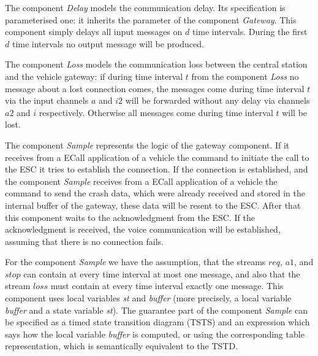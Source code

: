 \noindent
The component \emph{Delay} models the communication delay. 
Its specification is parameterised one: 
it inherits the parameter of the component \emph{Gateway}. 
This component simply delays all input messages on $d$ time intervals. 
During the first $d$ time intervals no output message will be produced. 

The component \emph{Loss} models the communication loss between 
the central station and the vehicle gateway: 
if during time interval $t$ from the component \emph{Loss} no message about a 
lost connection comes, the messages come during time interval 
$t$ via the input channels $a$ and $i2$ will be forwarded without any delay via channels 
$a2$ and $i$ respectively. 
Otherwise all messages come during time interval 
$t$ will be lost.  
  
The component \emph{Sample} represents the logic of the gateway component. 
If it receives from a ECall application of a vehicle 
 the command to initiate the call to the ESC it tries 
 to establish the connection.
If the connection is established, and the component \emph{Sample} receives 
from a ECall application of a vehicle
 the command to send the crash data, which were already received and stored 
 in the internal buffer of the gateway, 
 these data will be resent to the ESC. 
 After that this component waits to the acknowledgment from the ESC. 
 If the acknowledgment is received, the voice communication will be established, assuming that
  there is no connection fails.

For the component \emph{Sample} we have the assumption, that the 
streams $req$, $a1$, and $stop$ can contain at every time interval at most one message, 
and also that the stream $loss$ must contain at every time interval exactly one message. 
This component uses local variables \emph{st} and \emph{buffer} (more precisely, 
a local variable \emph{buffer} and a state variable \emph{st}). 
The guarantee part of  the component \emph{Sample} can be specified as a timed state transition diagram  (TSTS) 
and an expression which says how the local variable 
\emph{buffer} is computed, or using the corresponding table representation, which is semantically equivalent to the TSTD.  
  
